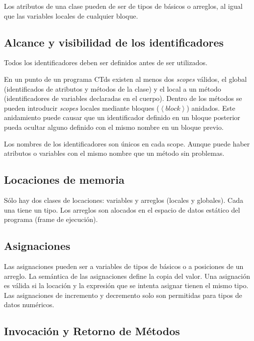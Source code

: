 \documentclass[11pt,a4paper]{article}
\begin{document}
Los atributos de una clase pueden de ser de tipos de básicos o arreglos, al igual que las variables locales de cualquier bloque.

\subsection{Alcance y visibilidad de los identificadores}
\label{identificadores}

Todos los identificadores deben ser definidos antes de ser utilizados. 

En un punto de un programa CTds existen al menos dos \textit{scopes} válidos, el global (identificados de atributos y métodos de la clase) y el local a un método (identificadores de variables declaradas en el cuerpo). Dentro de los métodos se pueden introducir \textit{scopes} locales mediante bloques ($\left\langle block \right\rangle$) anidados. Este anidamiento puede causar que un identificador definido en un bloque posterior pueda ocultar alguno definido con el mismo nombre en un bloque previo.

Los nombres de los identificadores son únicos en cada scope. Aunque puede haber atributos o variables con el mismo nombre que un método sin problemas.

\subsection{Locaciones de memoria}
\label{locaciones}

Sólo hay dos clases de locaciones: variables y arreglos (locales y globales). Cada una tiene un tipo. Los arreglos son alocados en el espacio de datos estático del programa (frame de ejecución). 

\subsection{Asignaciones}
\label{asignaciones}

Las asignaciones pueden ser a variables de tipos de básicos o a posiciones de un arreglo. La semántica de las asignaciones define la copia del valor. Una asignación es válida si la locación y la expresión que se intenta asignar tienen el mismo tipo. Las asignaciones de incremento y decremento solo son permitidas para tipos de datos numéricos.

\subsection{Invocación y Retorno de Métodos}
\label{metodos}
\end{document}

